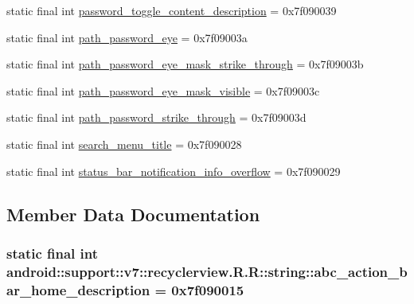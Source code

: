 \begin{CompactItemize}
\item 
static final int \hyperlink{classandroid_1_1support_1_1v7_1_1recyclerview_1_1_r_1_1string_1c9a6c26139de9f1bf40f2ad40b81e38}{password\_\-toggle\_\-content\_\-description} = 0x7f090039
\item 
static final int \hyperlink{classandroid_1_1support_1_1v7_1_1recyclerview_1_1_r_1_1string_a6acb0f2c20c278f02b7b51df6184dfd}{path\_\-password\_\-eye} = 0x7f09003a
\item 
static final int \hyperlink{classandroid_1_1support_1_1v7_1_1recyclerview_1_1_r_1_1string_516674568c0b79b2cdff7c79a4cff66c}{path\_\-password\_\-eye\_\-mask\_\-strike\_\-through} = 0x7f09003b
\item 
static final int \hyperlink{classandroid_1_1support_1_1v7_1_1recyclerview_1_1_r_1_1string_95962d26bb93bc21b37fc46685c81f1a}{path\_\-password\_\-eye\_\-mask\_\-visible} = 0x7f09003c
\item 
static final int \hyperlink{classandroid_1_1support_1_1v7_1_1recyclerview_1_1_r_1_1string_3625a7f507fbf1ce72df10fb8175832a}{path\_\-password\_\-strike\_\-through} = 0x7f09003d
\item 
static final int \hyperlink{classandroid_1_1support_1_1v7_1_1recyclerview_1_1_r_1_1string_b47266b6b803270932773dcde0de66f5}{search\_\-menu\_\-title} = 0x7f090028
\item 
static final int \hyperlink{classandroid_1_1support_1_1v7_1_1recyclerview_1_1_r_1_1string_ce50ee966a2878f868aabcba68af90b3}{status\_\-bar\_\-notification\_\-info\_\-overflow} = 0x7f090029
\end{CompactItemize}


\subsection{Member Data Documentation}
\hypertarget{classandroid_1_1support_1_1v7_1_1recyclerview_1_1_r_1_1string_f1526da9897d35ebaa77ee39f7122334}{
\subsubsection[{abc\_\-action\_\-bar\_\-home\_\-description}]{\setlength{\rightskip}{0pt plus 5cm}static final int android::support::v7::recyclerview.R.R::string::abc\_\-action\_\-bar\_\-home\_\-description = 0x7f090015}}
\label{classandroid_1_1support_1_1v7_1_1recyclerview_1_1_r_1_1string_f1526da9897d35ebaa77ee39f7122334}


